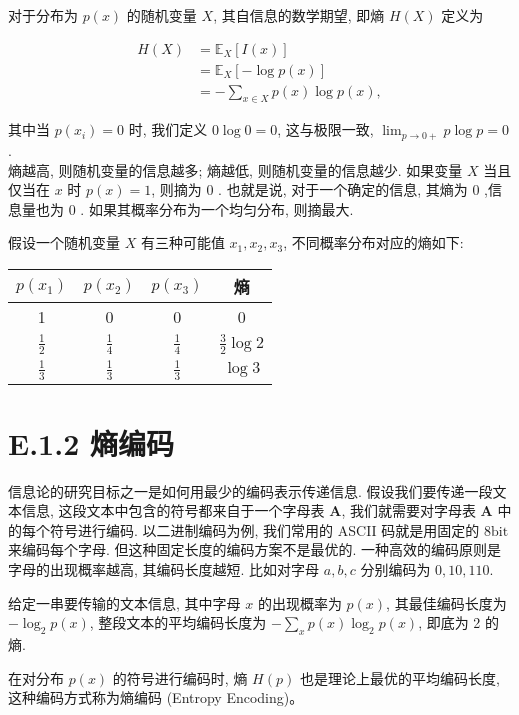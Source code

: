 \documentclass[10pt]{article}
\begin{document}
对于分布为 $p(x)$ 的随机变量 $X$, 其自信息的数学期望, 即熵 $H(X)$ 定义为


\begin{align*}
H(X) & =\mathbb{E}_{X}[I(x)]  \tag{E.2}\\
& =\mathbb{E}_{X}[-\log p(x)]  \tag{E.3}\\
& =-\sum_{x \in X} p(x) \log p(x), \tag{E.4}
\end{align*}


其中当 $p\left(x_{i}\right)=0$ 时, 我们定义 $0 \log 0=0$, 这与极限一致, $\lim _{p \rightarrow 0+} p \log p=0$.\\
熵越高, 则随机变量的信息越多; 熵越低, 则随机变量的信息越少. 如果变量 $X$ 当且仅当在 $x$ 时 $p(x)=1$, 则摘为 0 . 也就是说, 对于一个确定的信息, 其熵为 0 ,信息量也为 0 . 如果其概率分布为一个均匀分布, 则摘最大.

假设一个随机变量 $X$ 有三种可能值 $x_{1}, x_{2}, x_{3}$, 不同概率分布对应的熵如下:

\begin{center}
\begin{tabular}{ccc|c}
\hline
$p\left(x_{1}\right)$ & $p\left(x_{2}\right)$ & $p\left(x_{3}\right)$ & 熵 \\
\hline
1 & 0 & 0 & 0 \\
\hline
$\frac{1}{2}$ & $\frac{1}{4}$ & $\frac{1}{4}$ & $\frac{3}{2} \log 2$ \\
\hline
$\frac{1}{3}$ & $\frac{1}{3}$ & $\frac{1}{3}$ & $\log 3$ \\
\hline
\end{tabular}
\end{center}

\section*{E.1.2 熵编码}
信息论的研究目标之一是如何用最少的编码表示传递信息. 假设我们要传递一段文本信息, 这段文本中包含的符号都来自于一个字母表 $\boldsymbol{A}$, 我们就需要对字母表 $\boldsymbol{A}$ 中的每个符号进行编码. 以二进制编码为例, 我们常用的 ASCII 码就是用固定的 $8 \mathrm{bit}$ 来编码每个字母. 但这种固定长度的编码方案不是最优的. 一种高效的编码原则是字母的出现概率越高, 其编码长度越短. 比如对字母 $a, b, c$ 分别编码为 $0,10,110$.

给定一串要传输的文本信息, 其中字母 $x$ 的出现概率为 $p(x)$, 其最佳编码长度为 $-\log _{2} p(x)$, 整段文本的平均编码长度为 $-\sum_{x} p(x) \log _{2} p(x)$, 即底为 2 的熵.

在对分布 $p(x)$ 的符号进行编码时, 熵 $H(p)$ 也是理论上最优的平均编码长度,这种编码方式称为熵编码 (Entropy Encoding)。
\end{document}
